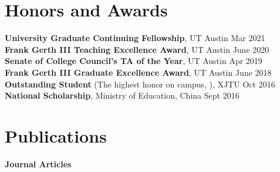 \documentclass[margin,line]{res}
\newenvironment{list2}{
  \begin{list}{$\bullet$}{%
      \setlength{\itemsep}{0in}
      \setlength{\parsep}{0in} \setlength{\parskip}{0in}
      \setlength{\topsep}{0in} \setlength{\partopsep}{0in} 
      \setlength{\leftmargin}{0.2in}}}{\end{list}}
\begin{document}
\begin{resume}
\section{\sc Honors and Awards} 
{\bf University Graduate Continuing Fellowship}, 
UT Austin \hfill {Mar 2021}\\
{\bf Frank Gerth III Teaching Excellence Award}, 
UT Austin \hfill {June 2020}\\
{\bf Senate of College Council's TA of the Year}, 
UT Austin \hfill {Apr 2019}\\
{\bf Frank Gerth III Graduate Excellence Award}, 
UT Austin \hfill {June 2018}\\
{\bf Outstanding Student} 
(The highest honor on campus, ),
XJTU \hfill {Oct 2016}\\
{\bf National Scholarship},
Ministry of Education, China \hfill {Sept 2016}


\newcommand{\vvspace}{\vspace{0.1in}}

\section{\sc Publications}

{\bf Journal Articles}
\vvspace


\end{resume}
\end{document}
